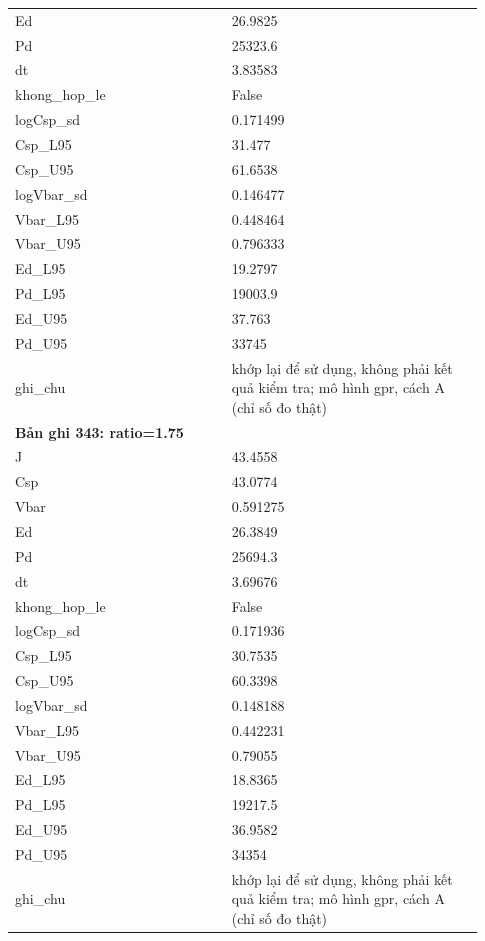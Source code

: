 \begin{longtable}{p{0.43\linewidth}p{0.50\linewidth}}
Ed & 26.9825 \\
Pd & 25323.6 \\
dt & 3.83583 \\
khong\_\allowbreak hop\_\allowbreak le & False \\
logCsp\_\allowbreak sd & 0.171499 \\
Csp\_\allowbreak L95 & 31.477 \\
Csp\_\allowbreak U95 & 61.6538 \\
logVbar\_\allowbreak sd & 0.146477 \\
Vbar\_\allowbreak L95 & 0.448464 \\
Vbar\_\allowbreak U95 & 0.796333 \\
Ed\_\allowbreak L95 & 19.2797 \\
Pd\_\allowbreak L95 & 19003.9 \\
Ed\_\allowbreak U95 & 37.763 \\
Pd\_\allowbreak U95 & 33745 \\
ghi\_\allowbreak chu & khớp lại để sử dụng, không phải kết quả kiểm tra; mô hình gpr, cách A (chỉ số đo thật) \\
\midrule
\multicolumn{2}{p{0.95\linewidth}}{\textbf{Bản ghi 343: ratio=1.75}} \\
J & 43.4558 \\
Csp & 43.0774 \\
Vbar & 0.591275 \\
Ed & 26.3849 \\
Pd & 25694.3 \\
dt & 3.69676 \\
khong\_\allowbreak hop\_\allowbreak le & False \\
logCsp\_\allowbreak sd & 0.171936 \\
Csp\_\allowbreak L95 & 30.7535 \\
Csp\_\allowbreak U95 & 60.3398 \\
logVbar\_\allowbreak sd & 0.148188 \\
Vbar\_\allowbreak L95 & 0.442231 \\
Vbar\_\allowbreak U95 & 0.79055 \\
Ed\_\allowbreak L95 & 18.8365 \\
Pd\_\allowbreak L95 & 19217.5 \\
Ed\_\allowbreak U95 & 36.9582 \\
Pd\_\allowbreak U95 & 34354 \\
ghi\_\allowbreak chu & khớp lại để sử dụng, không phải kết quả kiểm tra; mô hình gpr, cách A (chỉ số đo thật) \\

\end{longtable}
